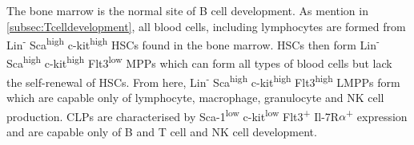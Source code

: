 The bone marrow is the normal site of B cell development.
As mention in \cref{subsec:Tcelldevelopment}, all blood cells, including lymphocytes are formed from Lin\textsuperscript{-} Sca\textsuperscript{high} c-kit\textsuperscript{high} HSCs found in the bone marrow.
HSCs then form Lin\textsuperscript{-} Sca\textsuperscript{high} c-kit\textsuperscript{high} Flt3\textsuperscript{low} MPPs which can form all types of blood cells but lack the self-renewal of HSCs.
From here, Lin\textsuperscript{-} Sca\textsuperscript{high} c-kit\textsuperscript{high} Flt3\textsuperscript{high} LMPPs form which are capable only of lymphocyte, macrophage, granulocyte and NK cell production.
CLPs are characterised by Sca-1\textsuperscript{low} c-kit\textsuperscript{low} Flt3\textsuperscript{+} Il-7R$\alpha$\textsuperscript{+} expression and are capable only of B and T cell and NK cell development.


